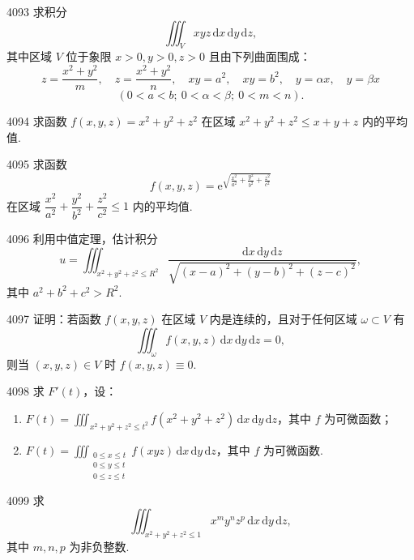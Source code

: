 \begin{prob}[M]{4093}
求积分
\[
\iiint_{V} xyz \,\mathrm{d}x\,\mathrm{d}y\,\mathrm{d}z,
\]
其中区域 $V$ 位于象限 $x>0, y>0, z>0$ 且由下列曲面围成：
\[
z=\frac{x^2+y^2}{m},\quad z=\frac{x^2+y^2}{n},\quad xy=a^2,\quad xy=b^2,\quad y=\alpha x,\quad y=\beta x
\]
\[
(0<a<b;\ 0<\alpha<\beta;\ 0<m<n).
\]
\end{prob}

\begin{prob}[M]{4094}
求函数 $f(x, y, z) = x^2+y^2+z^2$ 在区域 $x^2+y^2+z^2 \leqslant x+y+z$ 内的平均值.
\end{prob}

\begin{prob}[M]{4095}
求函数
\[
f(x, y, z) = \mathrm{e}^{\sqrt{\frac{x^2}{a^2}+\frac{y^2}{b^2}+\frac{z^2}{c^2}}}
\]
在区域 $\dfrac{x^2}{a^2}+\dfrac{y^2}{b^2}+\dfrac{z^2}{c^2} \leqslant 1$ 内的平均值.
\end{prob}

\begin{prob}[M]{4096}
利用中值定理，估计积分
\[
u = \iiint_{x^2+y^2+z^2 \leqslant R^2} \frac{\mathrm{d}x\,\mathrm{d}y\,\mathrm{d}z}{\sqrt{(x-a)^2+(y-b)^2+(z-c)^2}},
\]
其中 $a^2+b^2+c^2 > R^2$.
\end{prob}

\begin{prob}[M]{4097}
证明：若函数 $f(x, y, z)$ 在区域 $V$ 内是连续的，且对于任何区域 $\omega \subset V$ 有
\[
\iiint_{\omega} f(x, y, z) \,\mathrm{d}x\,\mathrm{d}y\,\mathrm{d}z = 0,
\]
则当 $(x, y, z) \in V$ 时 $f(x, y, z) \equiv 0$.
\end{prob}

\begin{prob}[M]{4098}
求 $F'(t)$，设：
\begin{enumerate}[label=(\alph*), itemsep=2pt, topsep=3pt]
\item $\displaystyle F(t) = \iiint_{x^2+y^2+z^2 \leqslant t^2} f(x^2+y^2+z^2) \,\mathrm{d}x\,\mathrm{d}y\,\mathrm{d}z$，其中 $f$ 为可微函数；
\item $\displaystyle F(t) = \iiint_{\substack{0 \leqslant x \leqslant t \\ 0 \leqslant y \leqslant t \\ 0 \leqslant z \leqslant t}} f(xyz) \,\mathrm{d}x\,\mathrm{d}y\,\mathrm{d}z$，其中 $f$ 为可微函数.
\end{enumerate}
\end{prob}

\begin{prob}[M]{4099}
求
\[
\iiint_{x^2+y^2+z^2 \leqslant 1} x^m y^n z^p \,\mathrm{d}x\,\mathrm{d}y\,\mathrm{d}z,
\]
其中 $m, n, p$ 为非负整数.
\end{prob}

